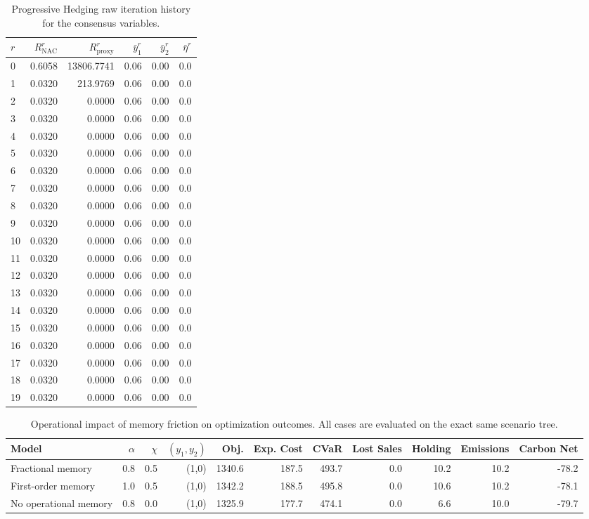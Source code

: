\documentclass[11pt,a4paper]{article}
\begin{document}
\begin{table}[ht]\small
\centering
\caption{Progressive Hedging raw iteration history for the consensus variables.}
\begin{tabular}{lrrrrr}
\toprule
$r$ & $R_{\mathrm{NAC}}^r$ & $R_{\mathrm{proxy}}^r$ & $\bar y_1^r$ & $\bar y_2^r$ & $\bar\eta^r$ \\
\midrule
0 & 0.6058 & 13806.7741 & 0.06 & 0.00 & 0.0 \\
1 & 0.0320 & 213.9769 & 0.06 & 0.00 & 0.0 \\
2 & 0.0320 & 0.0000 & 0.06 & 0.00 & 0.0 \\
3 & 0.0320 & 0.0000 & 0.06 & 0.00 & 0.0 \\
4 & 0.0320 & 0.0000 & 0.06 & 0.00 & 0.0 \\
5 & 0.0320 & 0.0000 & 0.06 & 0.00 & 0.0 \\
6 & 0.0320 & 0.0000 & 0.06 & 0.00 & 0.0 \\
7 & 0.0320 & 0.0000 & 0.06 & 0.00 & 0.0 \\
8 & 0.0320 & 0.0000 & 0.06 & 0.00 & 0.0 \\
9 & 0.0320 & 0.0000 & 0.06 & 0.00 & 0.0 \\
10 & 0.0320 & 0.0000 & 0.06 & 0.00 & 0.0 \\
11 & 0.0320 & 0.0000 & 0.06 & 0.00 & 0.0 \\
12 & 0.0320 & 0.0000 & 0.06 & 0.00 & 0.0 \\
13 & 0.0320 & 0.0000 & 0.06 & 0.00 & 0.0 \\
14 & 0.0320 & 0.0000 & 0.06 & 0.00 & 0.0 \\
15 & 0.0320 & 0.0000 & 0.06 & 0.00 & 0.0 \\
16 & 0.0320 & 0.0000 & 0.06 & 0.00 & 0.0 \\
17 & 0.0320 & 0.0000 & 0.06 & 0.00 & 0.0 \\
18 & 0.0320 & 0.0000 & 0.06 & 0.00 & 0.0 \\
19 & 0.0320 & 0.0000 & 0.06 & 0.00 & 0.0 \\
\bottomrule
\end{tabular}
\label{tab:ph_iters}
\end{table}

\begin{table}[ht]\small
\centering
\caption{Operational impact of memory friction on optimization outcomes. All cases are evaluated on the exact same scenario tree.}
\begin{tabular}{lrrrrrrrrrr}
\toprule
Model & $\alpha$ & $\chi$ & $(y_1, y_2)$ & Obj. & Exp. Cost & CVaR & Lost Sales & Holding & Emissions & Carbon Net \\
\midrule
Fractional memory & 0.8 & 0.5 & (1,0) & 1340.6 & 187.5 & 493.7 & 0.0 & 10.2 & 10.2 & -78.2 \\
First-order memory & 1.0 & 0.5 & (1,0) & 1342.2 & 188.5 & 495.8 & 0.0 & 10.6 & 10.2 & -78.1 \\
No operational memory & 0.8 & 0.0 & (1,0) & 1325.9 & 177.7 & 474.1 & 0.0 & 6.6 & 10.0 & -79.7 \\
\bottomrule
\end{tabular}
\label{tab:memory_friction}
\end{table}
\end{document}
